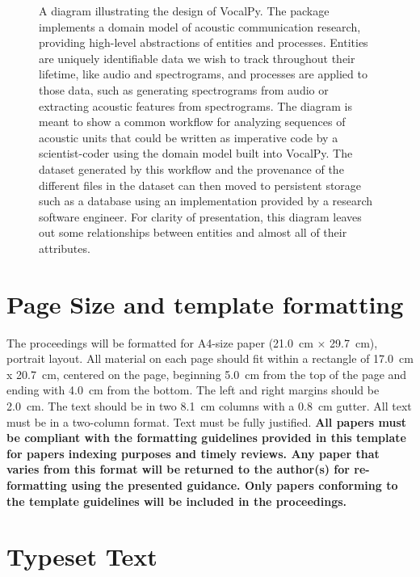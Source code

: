 \documentclass[11pt]{article}
\begin{document}
\begin{figure}[ht]
 \centerline{}
 \caption{ A diagram illustrating the design of VocalPy. The package implements a domain model of acoustic communication research, providing high-level abstractions of entities and processes. Entities are uniquely identifiable data we wish to track throughout their lifetime, like audio and spectrograms, and processes are applied to those data, such as generating spectrograms from audio or extracting acoustic features from spectrograms. The diagram is meant to show a common workflow for analyzing sequences of acoustic units that could be written as imperative code by a scientist-coder using the domain model built into VocalPy. The dataset generated by this workflow and the provenance of the different files in the dataset can then moved to persistent storage such as a database using an implementation provided by a research software engineer. For clarity of presentation, this diagram leaves out some relationships between entities and almost all of their attributes.}
 \label{fig:schematic}
\end{figure}


\section{Page Size and template formatting}\label{sec:page_size}

The proceedings will be formatted for
A4-size paper (\SI{21.0}{\centi\meter} $\times$ \SI{29.7}{\centi\meter}), portrait layout.
All material on each page should fit within a rectangle of \SI{17.0}{\centi\meter} x \SI{20.7}{\centi\meter},
centered on the page, beginning \SI{5.0}{\centi\meter}
from the top of the page and ending with \SI{4.0}{\centi\meter} from the bottom.
The left and right margins should be \SI{2.0}{\centi\meter}.
The text should be in two \SI{8.1}{\centi\meter} columns with a \SI{0.8}{\centi\meter} gutter.
All text must be in a two-column format. Text must be fully justified.
\textbf{All papers must be compliant with the formatting guidelines provided in this template for papers indexing purposes and timely reviews. Any paper that varies from this format will be returned to the author(s) for re-formatting using the presented guidance. Only papers conforming to the template guidelines will be included in the proceedings.}

\section{Typeset Text}\label{sec:typeset_text}
\end{document}
